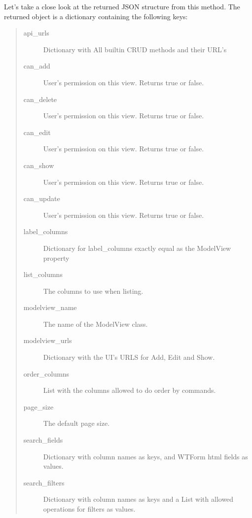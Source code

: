\documentclass[letterpaper,10pt,english]{sphinxmanual}
\begin{document}
Let's take a close look at the returned JSON structure from this method. The returned object is a dictionary containing
the following keys:
\begin{quote}\begin{description}
\item[{api\_urls}] \leavevmode
Dictionary with All builtin CRUD methods and their URL's

\item[{can\_add}] \leavevmode
User's permission on this view. Returns true or false.

\item[{can\_delete}] \leavevmode
User's permission on this view. Returns true or false.

\item[{can\_edit}] \leavevmode
User's permission on this view. Returns true or false.

\item[{can\_show}] \leavevmode
User's permission on this view. Returns true or false.

\item[{can\_update}] \leavevmode
User's permission on this view. Returns true or false.

\item[{label\_columns}] \leavevmode
Dictionary for label\_columns exactly equal as the ModelView property

\item[{list\_columns}] \leavevmode
The columns to use when listing.

\item[{modelview\_name}] \leavevmode
The name of the ModelView class.

\item[{modelview\_urls}] \leavevmode
Dictionary with the UI's URLS for Add, Edit and Show.

\item[{order\_columns}] \leavevmode
List with the columns allowed to do order by commands.

\item[{page\_size}] \leavevmode
The default page size.

\item[{search\_fields}] \leavevmode
Dictionary with column names as keys, and WTForm html fields as values.

\item[{search\_filters}] \leavevmode
Dictionary with column names as keys and a List with allowed operations for filters as values.

\end{description}\end{quote}
\end{document}
